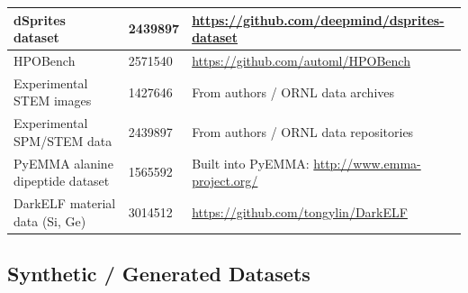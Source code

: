 \documentclass[11pt,a4paper]{article}
\begin{document}
\begin{longtable}{p{4.5cm} p{3cm} p{6.5cm}}
dSprites dataset & 2439897 & \url{https://github.com/deepmind/dsprites-dataset} \\
\midrule
HPOBench & 2571540 & \url{https://github.com/automl/HPOBench} \\
\midrule

Experimental STEM images & 1427646 & From authors / ORNL data archives \\
\midrule
Experimental SPM/STEM data & 2439897 & From authors / ORNL data repositories \\
\midrule

PyEMMA alanine dipeptide dataset & 1565592 & Built into PyEMMA: \url{http://www.emma-project.org/} \\
\midrule

DarkELF material data (Si, Ge) & 3014512 & \url{https://github.com/tongylin/DarkELF} \\
\bottomrule
\end{longtable}


\subsection{Synthetic / Generated Datasets}
\end{document}
